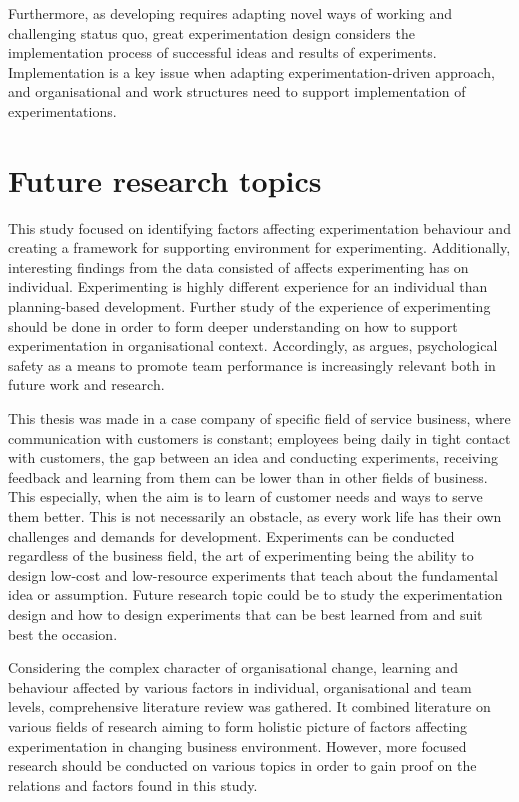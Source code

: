 Furthermore, as developing requires adapting novel ways of working and challenging status quo, great experimentation design considers the implementation process of successful ideas and results of experiments. Implementation is a key issue when adapting experimentation-driven approach, and organisational and work structures need to support implementation of experimentations. 

\section{Future research topics}
This study focused on identifying factors affecting experimentation behaviour and creating a framework for supporting environment for experimenting. Additionally, interesting findings from the data consisted of affects experimenting has on individual. Experimenting is highly different experience for an individual than planning-based development. Further study of the experience of experimenting should be done in order to form deeper understanding on how to support experimentation in organisational context. Accordingly, as \citet{edmondson1999psychological} argues, psychological safety as a means to promote team performance is increasingly relevant both in future work and research. 

This thesis was made in a case company of specific field of service business, where communication with customers is constant; employees being daily in tight contact with customers, the gap between an idea and conducting experiments, receiving feedback and learning from them can be lower than in other fields of business. This especially, when the aim is to learn of customer needs and ways to serve them better. This is not necessarily an obstacle, as every work life has their own challenges and demands for development. Experiments can be conducted regardless of the business field, the art of experimenting being the ability to design low-cost and low-resource experiments that teach about the fundamental idea or assumption. Future research topic could be to study the experimentation design and how to design experiments that can be best learned from and suit best the occasion. 

Considering the complex character of organisational change, learning and behaviour affected by various factors in individual, organisational and team levels, comprehensive literature review was gathered. It combined literature on various fields of research aiming to form holistic picture of factors affecting experimentation in changing business environment. However, more focused research should be conducted on various topics in order to gain proof on the relations and factors found in this study. 

